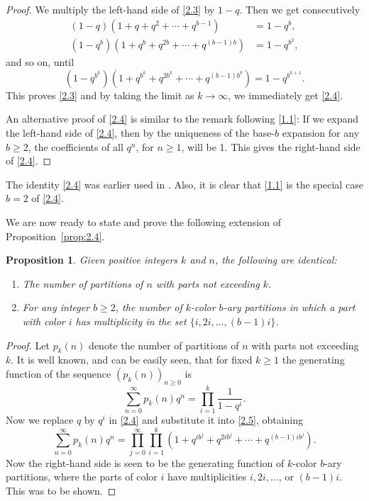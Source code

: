 \documentclass{amsart}
\theoremstyle{plain}
\newtheorem{proposition}[theorem]{Proposition}
\numberwithin{equation}{section}
\begin{document}
\begin{proof}
We multiply the left-hand side of \eqref{2.3} by $1-q$. Then we get
consecutively
\begin{align*}
(1-q)\left(1+q+q^2+\cdots+q^{b-1}\right) &= 1-q^b,\\
\left(1-q^b\right)\left(1+q^b+q^{2b}+\cdots+q^{(b-1)b}\right) &= 1-q^{b^2},
\end{align*}
and so on, until
\[
\left(1-q^{b^k}\right)\left(1+q^{b^k}+q^{2b^k}+\cdots+q^{(b-1)b^k}\right)
=1-q^{b^{k+1}}.
\]
This proves \eqref{2.3} and by taking the limit as $k\to\infty$, we 
immediately get \eqref{2.4}.

An alternative proof of \eqref{2.4} is similar to the remark following 
\eqref{1.1}: If we expand the left-hand side of \eqref{2.4}, then by the
uniqueness of the base-$b$ expansion for any $b\geq 2$, the coefficients of
all $q^n$, for $n\geq 1$, will be 1. This gives the right-hand side of 
\eqref{2.4}.
\end{proof}

The identity \eqref{2.4} was earlier used in \cite[Cor.~8.1]{DE10}. Also, it
is clear that \eqref{1.1} is the special case $b=2$ of \eqref{2.4}.

We are now ready to state and prove the following extension of 
Proposition~\ref{prop:2.4}.

\begin{proposition}\label{prop:2.7}
Given positive integers $k$ and $n$, the following are identical:
\begin{enumerate}
\item[(a)] The number of partitions of $n$ with parts not exceeding $k$.
\item[(b)] For any integer $b\geq 2$, the number of $k$-color $b$-ary 
partitions in which a part with color $i$ has multiplicity in the set
$\{i, 2i,\ldots, (b-1)i\}$.
\end{enumerate}
\end{proposition}

\begin{proof}
Let $p_k(n)$ denote the number of partitions of $n$ with parts not exceeding
$k$. It is well known, and can be easily seen, that for fixed $k\geq 1$ the
generating function of the sequence $\left(p_k(n)\right)_{n\geq 0}$ is
\begin{equation}\label{2.5}
\sum_{n=0}^\infty p_k(n)q^n = \prod_{i=1}^k\frac{1}{1-q^i}.
\end{equation}
Now we replace $q$ by $q^i$ in \eqref{2.4} and substitute it into \eqref{2.5},
obtaining
\begin{equation}\label{2.6}
\sum_{n=0}^\infty p_k(n)q^n = \prod_{j=0}^\infty\prod_{i=1}^k
\left(1+q^{ib^j}+q^{2ib^j}+\cdots+q^{(b-1)ib^j}\right).
\end{equation}
Now the right-hand side is seen to be the generating function of $k$-color 
$b$-ary partitions, where the parts of color $i$ have multiplicities
$i, 2i,\ldots$, or $(b-1)i$. This was to be shown.
\end{proof}
\end{document}
